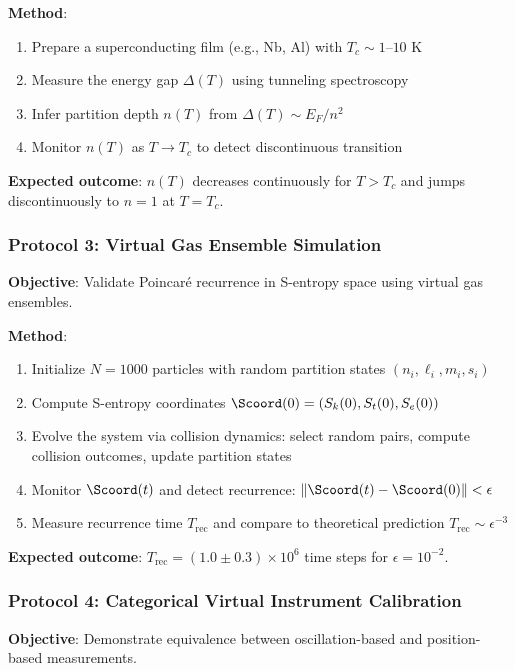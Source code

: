 \textbf{Method}:
\begin{enumerate}
    \item Prepare a superconducting film (e.g., Nb, Al) with $T_c \sim 1$–$10$ K
    \item Measure the energy gap $\Delta(T)$ using tunneling spectroscopy
    \item Infer partition depth $n(T)$ from $\Delta(T) \sim E_F/n^2$
    \item Monitor $n(T)$ as $T \to T_c$ to detect discontinuous transition
\end{enumerate}

\textbf{Expected outcome}: $n(T)$ decreases continuously for $T > T_c$ and jumps discontinuously to $n = 1$ at $T = T_c$.

\subsubsection{Protocol 3: Virtual Gas Ensemble Simulation}

\textbf{Objective}: Validate Poincaré recurrence in S-entropy space using virtual gas ensembles.

\textbf{Method}:
\begin{enumerate}
    \item Initialize $N = 1000$ particles with random partition states $(n_i, \ell_i, m_i, s_i)$
    \item Compute S-entropy coordinates $\Scoord(0) = (S_k(0), S_t(0), S_e(0))$
    \item Evolve the system via collision dynamics: select random pairs, compute collision outcomes, update partition states
    \item Monitor $\Scoord(t)$ and detect recurrence: $\|\Scoord(t) - \Scoord(0)\| < \epsilon$
    \item Measure recurrence time $T_{\text{rec}}$ and compare to theoretical prediction $T_{\text{rec}} \sim \epsilon^{-3}$
\end{enumerate}

\textbf{Expected outcome}: $T_{\text{rec}} = (1.0 \pm 0.3) \times 10^6$ time steps for $\epsilon = 10^{-2}$.

\subsubsection{Protocol 4: Categorical Virtual Instrument Calibration}

\textbf{Objective}: Demonstrate equivalence between oscillation-based and position-based measurements.

